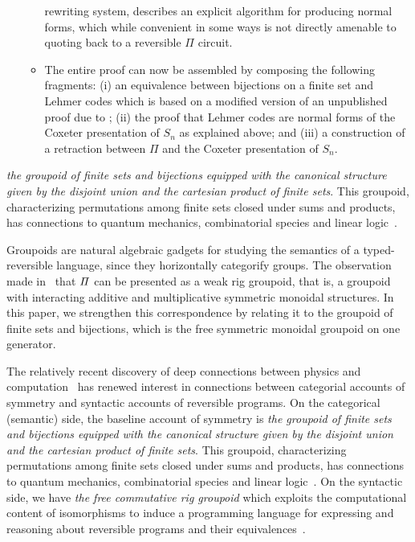 \begin{itemize}
\begin{itemize}
      rewriting system, describes an explicit algorithm for producing normal
      forms, which while convenient in some ways is not directly amenable to
      quoting back to a reversible $\Pi$ circuit.
    \item The entire proof can now be assembled by composing the following
      fragments: (i) an equivalence between bijections on a finite set and
      Lehmer codes which is based on a modified version of an unpublished
      proof due to \citet{Molzer-cubical}; (ii) the proof that Lehmer
      codes are normal forms of the Coxeter presentation of $S_n$ as explained
      above; and (iii) a construction of a retraction between $\Pi$ and the
      Coxeter presentation of $S_n$.
  \end{itemize}
\end{itemize}

\newpage


\emph{the groupoid of finite sets and bijections
  equipped with the canonical structure given by the disjoint union and the
  cartesian product of finite sets}. This groupoid, characterizing permutations
among finite sets closed under sums and products, has connections to quantum
mechanics, combinatorial species and linear
logic~\cite{brent,catalgqm,catalgqm2}.


Groupoids are natural algebraic gadgets for studying the semantics of a
typed-reversible language, since they horizontally categorify groups. The
observation made in~\cite{caretteComputingSemiringsWeak2016} that $\mathit{\Pi}$ can
be presented as a weak rig groupoid, that is, a groupoid with interacting
additive and multiplicative symmetric monoidal structures. In this paper, we
strengthen this correspondence by relating it to the groupoid of finite sets and
bijections, which is the free symmetric monoidal groupoid on one generator.

The relatively recent discovery of deep connections between physics and
computation~\cite{Landauer:1961,PhysRevA.32.3266,Toffoli:1980,bennett1985fundamental,Frank:1999:REC:930275,
  Hey:1999:FCE:304763,fredkin1982conservative, springerlink:10.1007/BF02650179}
has renewed interest in connections between categorial accounts of symmetry and
syntactic accounts of reversible programs. On the categorical (semantic) side,
the baseline account of symmetry is \emph{the groupoid of finite sets and
  bijections equipped with the canonical structure given by the disjoint union
  and the cartesian product of finite sets}. This groupoid, characterizing
permutations among finite sets closed under sums and products, has connections
to quantum mechanics, combinatorial species and linear
logic~\cite{brent,catalgqm,catalgqm2}. On the syntactic side, we have \emph{the
  free commutative rig groupoid} which exploits the computational content of
isomorphisms to induce a programming language for expressing and reasoning about
reversible programs and their
equivalences~\cite{James:2012:IE:2103656.2103667,Carette2016}.

